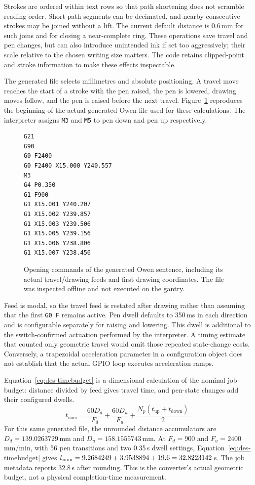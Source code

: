 Strokes are ordered within text rows so that path shortening does not scramble reading order. Short path segments can be decimated, and nearby consecutive strokes may be joined without a lift. The current default distance is 0.6\,mm for such joins and for closing a near-complete ring. These operations save travel and pen changes, but can also introduce unintended ink if set too aggressively; their scale relative to the chosen writing size matters. The code retains clipped-point and stroke information to make these effects inspectable.

The generated file selects millimetres and absolute positioning. A travel move reaches the start of a stroke with the pen raised, the pen is lowered, drawing moves follow, and the pen is raised before the next travel. Figure~\ref{fig:des-gcode-excerpt} reproduces the beginning of the actual generated Owen file used for these calculations. The interpreter assigns \texttt{M3} and \texttt{M5} to pen down and pen up respectively.

\begin{figure}[!htbp]
\begin{lstlisting}[style=designcode]
G21
G90
G0 F2400
G0 F2400 X15.000 Y240.557
M3
G4 P0.350
G1 F900
G1 X15.001 Y240.207
G1 X15.002 Y239.857
G1 X15.003 Y239.506
G1 X15.005 Y239.156
G1 X15.006 Y238.806
G1 X15.007 Y238.456
\end{lstlisting}
\caption{Opening commands of the generated Owen sentence, including its actual travel/drawing feeds and first drawing coordinates. The file was inspected offline and not executed on the gantry.}
\label{fig:des-gcode-excerpt}
\end{figure}

Feed is modal, so the travel feed is restated after drawing rather than assuming that the first \texttt{G0 F} remains active. Pen dwell defaults to 350\,ms in each direction and is configurable separately for raising and lowering. This dwell is additional to the switch-confirmed actuation performed by the interpreter. A timing estimate that counted only geometric travel would omit those repeated state-change costs. Conversely, a trapezoidal acceleration parameter in a configuration object does not establish that the actual GPIO loop executes acceleration ramps.

Equation~\ref{eq:des-timebudget} is a dimensional calculation of the nominal job budget: distance divided by feed gives travel time, and pen-state changes add their configured dwells.
\begin{equation}
t_{\mathrm{nom}}=\frac{60D_d}{F_d}+\frac{60D_u}{F_u}
+\frac{N_p(t_{\mathrm{up}}+t_{\mathrm{down}})}{2}.
\label{eq:des-timebudget}
\end{equation}
For this same generated file, the unrounded distance accumulators are $D_d=139.0263729$\,mm and $D_u=158.1555743$\,mm. At $F_d=900$ and $F_u=2400$\,mm/min, with 56 pen transitions and two 0.35\,s dwell settings, Equation~\ref{eq:des-timebudget} gives $t_{\rm nom}=9.2684249+3.9538894+19.6=32.8223142$\,s. The job metadata reports 32.8\,s after rounding. This is the converter's actual geometric budget, not a physical completion-time measurement.

